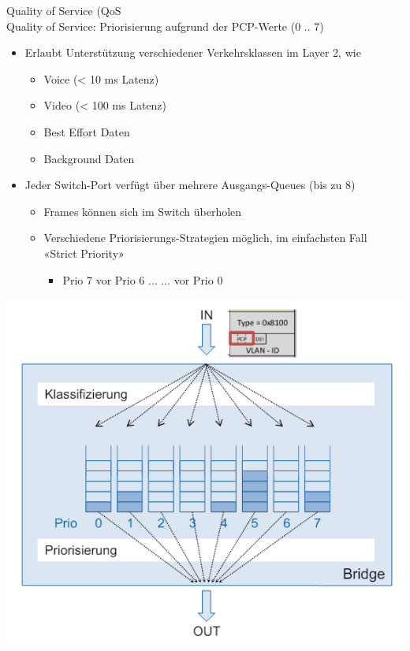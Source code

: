 \begin{concept}{Quality of Service (QoS}\\
    Quality of Service: Priorisierung aufgrund der PCP-Werte (0 .. 7)
    \begin{itemize}
        \item Erlaubt Unterstützung verschiedener Verkehrsklassen im Layer 2, wie
        \begin{itemize}
            \item Voice (< 10 ms Latenz)
            \item Video (< 100 ms Latenz)
            \item Best Effort Daten
            \item Background Daten
        \end{itemize}
        \item Jeder Switch-Port verfügt über mehrere Ausgangs-Queues (bis zu 8)
        \begin{itemize}
            \item Frames können sich im Switch überholen
            \item Verschiedene Priorisierungs-Strategien möglich, im einfachsten Fall «Strict Priority»
            \begin{itemize}
                \item Prio 7 vor Prio 6 ... ... vor Prio 0
            \end{itemize}
        \end{itemize}
    \end{itemize}
        \includegraphics[width=0.7\linewidth]{images/qualityofservice.png}
\end{concept}

